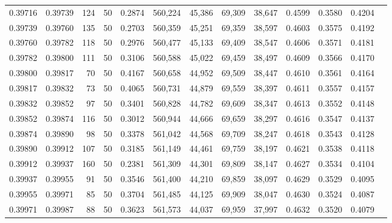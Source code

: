 \begin{tabular}{rrrrrrrrrrrrr}
0.39716 & 0.39739 &   124 &  50 &                                     0.2874 & 560,224 &  45,386 &  69,309 &  38,647 & 0.4599 & 0.3580 & 0.4204 \\
0.39739 & 0.39760 &   135 &  50 &                                     0.2703 & 560,359 &  45,251 &  69,359 &  38,597 & 0.4603 & 0.3575 & 0.4192 \\
0.39760 & 0.39782 &   118 &  50 &                                     0.2976 & 560,477 &  45,133 &  69,409 &  38,547 & 0.4606 & 0.3571 & 0.4181 \\
0.39782 & 0.39800 &   111 &  50 &                                     0.3106 & 560,588 &  45,022 &  69,459 &  38,497 & 0.4609 & 0.3566 & 0.4170 \\
0.39800 & 0.39817 &    70 &  50 &                                     0.4167 & 560,658 &  44,952 &  69,509 &  38,447 & 0.4610 & 0.3561 & 0.4164 \\
0.39817 & 0.39832 &    73 &  50 &                                     0.4065 & 560,731 &  44,879 &  69,559 &  38,397 & 0.4611 & 0.3557 & 0.4157 \\
0.39832 & 0.39852 &    97 &  50 &                                     0.3401 & 560,828 &  44,782 &  69,609 &  38,347 & 0.4613 & 0.3552 & 0.4148 \\
0.39852 & 0.39874 &   116 &  50 &                                     0.3012 & 560,944 &  44,666 &  69,659 &  38,297 & 0.4616 & 0.3547 & 0.4137 \\
0.39874 & 0.39890 &    98 &  50 &                                     0.3378 & 561,042 &  44,568 &  69,709 &  38,247 & 0.4618 & 0.3543 & 0.4128 \\
0.39890 & 0.39912 &   107 &  50 &                                     0.3185 & 561,149 &  44,461 &  69,759 &  38,197 & 0.4621 & 0.3538 & 0.4118 \\
0.39912 & 0.39937 &   160 &  50 &                                     0.2381 & 561,309 &  44,301 &  69,809 &  38,147 & 0.4627 & 0.3534 & 0.4104 \\
0.39937 & 0.39955 &    91 &  50 &                                     0.3546 & 561,400 &  44,210 &  69,859 &  38,097 & 0.4629 & 0.3529 & 0.4095 \\
0.39955 & 0.39971 &    85 &  50 &                                     0.3704 & 561,485 &  44,125 &  69,909 &  38,047 & 0.4630 & 0.3524 & 0.4087 \\
0.39971 & 0.39987 &    88 &  50 &                                     0.3623 & 561,573 &  44,037 &  69,959 &  37,997 & 0.4632 & 0.3520 & 0.4079 \\

\end{tabular}
